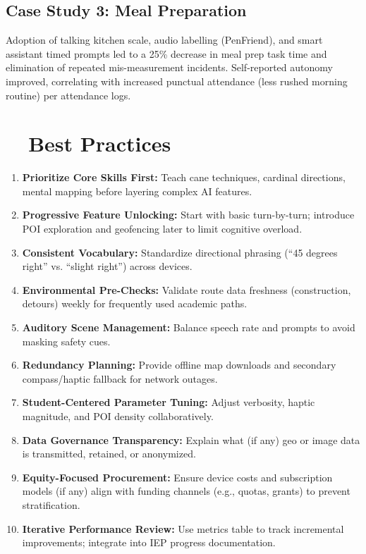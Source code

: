 \subsection{Case Study 3: Meal Preparation }
Adoption of talking kitchen scale, audio labelling (PenFriend), and smart assistant timed prompts led to a 25\% decrease in meal prep task time and elimination of repeated mis-measurement incidents. Self-reported autonomy improved, correlating with increased punctual attendance (less rushed morning routine) per attendance logs.\supercite{MarketResearch2025, AllAboutVision2023}

\section{~~Best Practices}\label{ch8:sec:best-practices}
\begin{enumerate}
	\item \textbf{Prioritize Core Skills First:} Teach cane techniques, cardinal directions, mental mapping before layering complex AI features.\supercite{OrientationMobilityInstruction}
	\item \textbf{Progressive Feature Unlocking:} Start with basic turn-by-turn; introduce POI exploration and geofencing later to limit cognitive overload.
	\item \textbf{Consistent Vocabulary:} Standardize directional phrasing (``45 degrees right'' vs. ``slight right'') across devices.
	\item \textbf{Environmental Pre-Checks:} Validate route data freshness (construction, detours) weekly for frequently used academic paths.\supercite{InclusiveCityMaker2023}
	\item \textbf{Auditory Scene Management:} Balance  speech rate and  prompts to avoid masking safety cues.
	\item \textbf{Redundancy Planning:} Provide offline map downloads and secondary compass/haptic fallback for network outages.
	\item \textbf{Student-Centered Parameter Tuning:} Adjust verbosity, haptic magnitude, and POI density collaboratively.
	\item \textbf{Data Governance Transparency:} Explain what (if any) geo or image data is transmitted, retained, or anonymized.\supercite{DataPrivacyAI}
	\item \textbf{Equity-Focused Procurement:} Ensure device costs and subscription models (if any) align with funding channels (e.g., quotas, grants) to prevent stratification.\supercite{AEMCenter}
	\item \textbf{Iterative Performance Review:} Use metrics table to track incremental improvements; integrate into IEP progress documentation.\supercite{StudentOutcomesResearch}
\end{enumerate}

